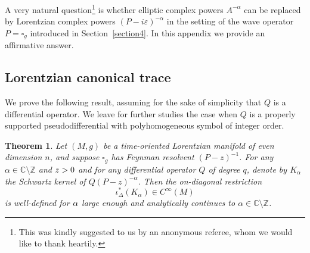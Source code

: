 \documentclass[10pt]{amsart}
\newtheorem{theorem}{Theorem}[section]
\theoremstyle{definition}
\newcommand\cc{{\mathbb C}}
\let\cv\alpha
\let\Im\relax
\let\Re\relax
\DeclareMathOperator{\Im}{Im}
\DeclareMathOperator{\Re}{Re}
\renewcommand{\sec}[1]{Section~\ref{#1}}
\begin{document}
A very natural question\footnote{This was kindly suggested to us by an anonymous referee, whom we would like to thank heartily.} is whether elliptic complex powers $A^{-\cv}$ can be replaced by Lorentzian complex powers $(P-i\varepsilon)^{-\cv}$ in the setting of the wave operator $P=\square_g$ introduced in \sec{section4}. In this appendix we provide an affirmative answer.

\subsection{Lorentzian canonical trace} We prove the following result, assuming for the sake of simplicity that $Q$ is a differential operator. We leave for further studies the case when $Q$ is a properly supported pseudodifferential with polyhomogeneous symbol of integer order.

\begin{theorem}
Let $(M,g)$ be a time-oriented Lorentzian manifold of even dimension $n$, and suppose $\square_g$ has Feynman resolvent $(P-z)^{-1}$. For any $\cv\in\cc\setminus \mathbb{Z}$ and $\Im z > 0$ and for any differential operator $Q$ of degree $q$, denote by $K_\cv$ the Schwartz kernel of $Q(P-z)^{-\cv}$. Then the on-diagonal restriction
\begin{equation*}
\iota_\Delta^*\left(K_\cv \right)\in C^\infty(M)
\end{equation*}
is well-defined for $\Re \cv$ large enough and analytically continues to $\cv\in \mathbb{C}\setminus \mathbb{Z}$.
\end{theorem}
\end{document}
